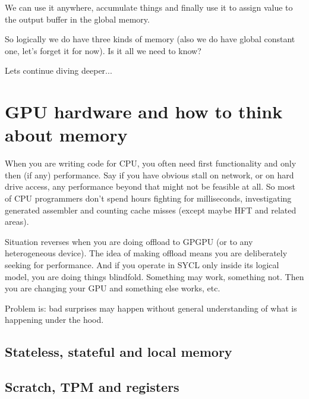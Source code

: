 \documentclass[a4paper,12pt,oneside]{article}
\begin{document}
We can use it anywhere, accumulate things and finally use it to assign value to the output buffer in the global memory.

So logically we do have three kinds of memory (also we do have global constant one, let's forget it for now). Is it all we need to know?

Lets continue diving deeper...

\section{GPU hardware and how to think about memory}\label{sec:GPUHW}


When you are writing code for CPU, you often need first functionality and only then (if any) performance. Say if you have obvious stall on network, or on hard drive access, any performance beyond that might not be feasible at all. So most of CPU programmers don't spend hours fighting for milliseconds, investigating generated assembler and counting cache misses (except maybe HFT and related areas).

Situation reverses when you are doing offload to GPGPU (or to any heterogeneous device). The idea of making offload means you are deliberately seeking for performance. And if you operate in SYCL only inside its logical model, you are doing things blindfold. Something may work, something not. Then you are changing your GPU and something else works, etc.

Problem is: bad surprises may happen without general understanding of what is happening under the hood.

\subsection{Stateless, stateful and local memory}\label{subsec:StatelessFull}


\subsection{Scratch, TPM and registers}\label{subsec:ScratchTPM}

\end{document}
